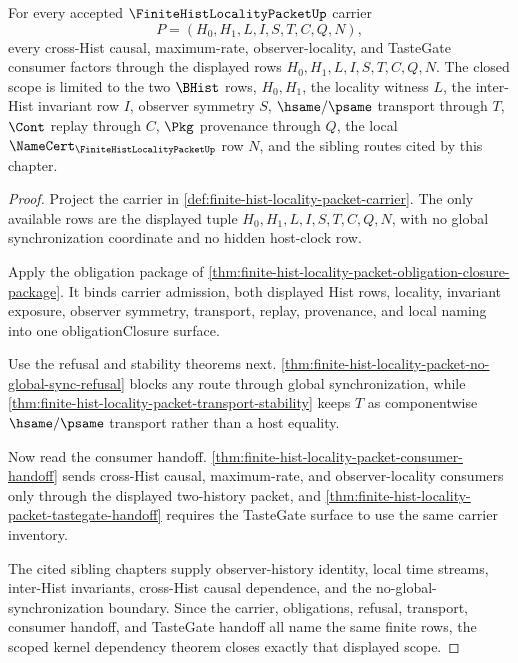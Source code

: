 \begin{theorem}
\label{thm:finitehist-locality-scoped-kernel-scope}
For every accepted $\FiniteHistLocalityPacketUp$ carrier
$$
P=(H_0,H_1,L,I,S,T,C,Q,N),
$$
every cross-Hist causal, maximum-rate, observer-locality, and TasteGate consumer factors through the displayed rows $H_0,H_1,L,I,S,T,C,Q,N$. The closed scope is limited to the two $\BHist$ rows, $H_0,H_1$, the locality witness $L$, the inter-Hist invariant row $I$, observer symmetry $S$, $\hsame/\psame$ transport through $T$, $\Cont$ replay through $C$, $\Pkg$ provenance through $Q$, the local $\NameCert_{\FiniteHistLocalityPacketUp}$ row $N$, and the sibling routes cited by this chapter.
\end{theorem}
\begin{proof}
Project the carrier in \autoref{def:finite-hist-locality-packet-carrier}. The only available rows are the displayed tuple $H_0,H_1,L,I,S,T,C,Q,N$, with no global synchronization coordinate and no hidden host-clock row.

Apply the obligation package of \autoref{thm:finite-hist-locality-packet-obligation-closure-package}. It binds carrier admission, both displayed Hist rows, locality, invariant exposure, observer symmetry, transport, replay, provenance, and local naming into one obligationClosure surface.

Use the refusal and stability theorems next. \autoref{thm:finite-hist-locality-packet-no-global-sync-refusal} blocks any route through global synchronization, while \autoref{thm:finite-hist-locality-packet-transport-stability} keeps $T$ as componentwise $\hsame/\psame$ transport rather than a host equality.

Now read the consumer handoff. \autoref{thm:finite-hist-locality-packet-consumer-handoff} sends cross-Hist causal, maximum-rate, and observer-locality consumers only through the displayed two-history packet, and \autoref{thm:finite-hist-locality-packet-tastegate-handoff} requires the TasteGate surface to use the same carrier inventory.

The cited sibling chapters supply observer-history identity, local time streams, inter-Hist invariants, cross-Hist causal dependence, and the no-global-synchronization boundary. Since the carrier, obligations, refusal, transport, consumer handoff, and TasteGate handoff all name the same finite rows, the scoped kernel dependency theorem closes exactly that displayed scope.
\end{proof}


